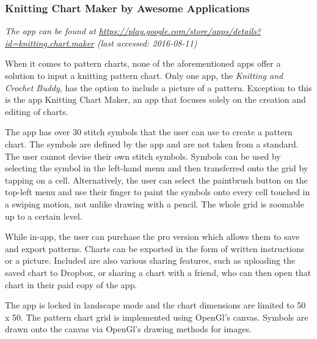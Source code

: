 \subsubsection*{Knitting Chart Maker by Awesome Applications}

\textit{The app can be found at \url{https://play.google.com/store/apps/details?id=knitting.chart.maker} \small{(last accessed: 2016-08-11)}}
\vspace*{0.5cm}

\noindent When it comes to pattern charts, none of the aforementioned apps offer a solution to input a knitting pattern chart. Only one app, the \textit{Knitting and Crochet Buddy}, has the option to include a picture of a pattern. Exception to this is the app Knitting Chart Maker, an app that focuses solely on the creation and editing of charts.

The app has over 30 stitch symbols that the user can use to create a pattern chart. The symbols are defined by the app and are not taken from a standard. The user cannot devise their own stitch symbols. Symbols can be used by selecting the symbol in the left-hand menu and then transferred onto the grid by tapping on a cell. Alternatively, the user can select the paintbrush button on the top-left menu and use their finger to paint the symbols onto every cell touched in a swiping motion, not unlike drawing with a pencil. The whole grid is zoomable up to a certain level.

While in-app, the user can purchase the pro version which allows them to save and export patterns. Charts can be exported in the form of written instructions or a picture. Included are also various sharing features, such as uploading the saved chart to Dropbox, or sharing a chart with a friend, who can then open that chart in their paid copy of the app.

The app is locked in landscape mode and the chart dimensions are limited to 50 x 50. The pattern chart grid is implemented using OpenGl’s canvas. Symbols are drawn onto the canvas via OpenGl's drawing methods for images.

